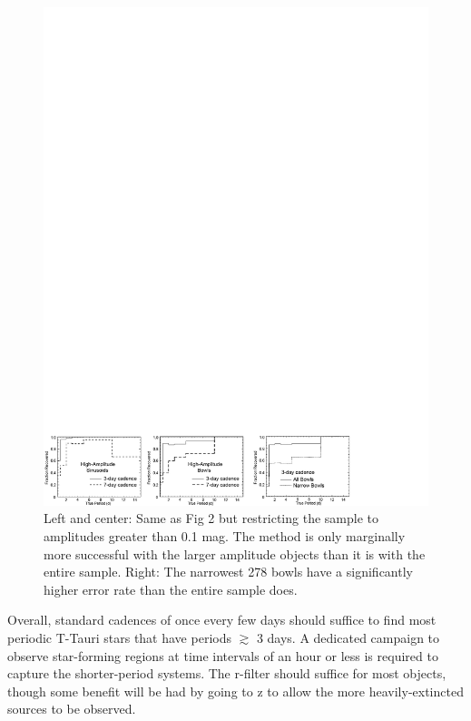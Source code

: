 \begin{figure}[b]
\vspace*{1.0 cm}
\begin{center}
 \includegraphics[width=5.32in]{figs/starFormation/tts3.pdf}
 \caption{Left and center: Same as Fig 2 but restricting the sample to amplitudes greater than 0.1 mag. The
method is only marginally more successful with the larger amplitude objects than it is with the entire sample.
Right: The narrowest 278 bowls have a significantly higher error rate than the entire sample does.
}
   \label{tts3}
\end{center}
\end{figure}

Overall, standard cadences of once every few days should suffice
to find most periodic T-Tauri stars that have periods $\gtrsim$ 3 days.
A dedicated campaign to observe star-forming regions
at time intervals of an hour or less is required to capture the shorter-period systems.
The r-filter should suffice for most objects, though some benefit will be had
by going to z to allow the more heavily-extincted sources to be observed.

